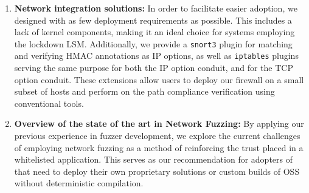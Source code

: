 \begin{enumerate}
    \item \textbf{Network integration solutions:} In order to facilitate easier
    adoption, we designed \daf{} with as few deployment requirements as
    possible. This includes a lack of kernel components, making it an ideal
    choice for systems employing the lockdown LSM. Additionally, we provide
    a \texttt{snort3} plugin for matching and verifying HMAC annotations as
    IP options, as well as \texttt{iptables} plugins serving the same purpose
    for both the IP option conduit, and for the TCP option conduit. These
    extensions allow users to deploy our firewall on a small subset of hosts and
    perform on the path compliance verification using conventional tools.

    \item \textbf{Overview of the state of the art in Network Fuzzing:}
    By applying our previous experience in fuzzer development,
    we explore the current challenges of employing network fuzzing
    as a method of reinforcing the trust placed in a
    whitelisted application. This serves as our recommendation for adopters of
    \daf{} that need to deploy their own proprietary solutions or custom builds
    of OSS without deterministic compilation.
\end{enumerate}

